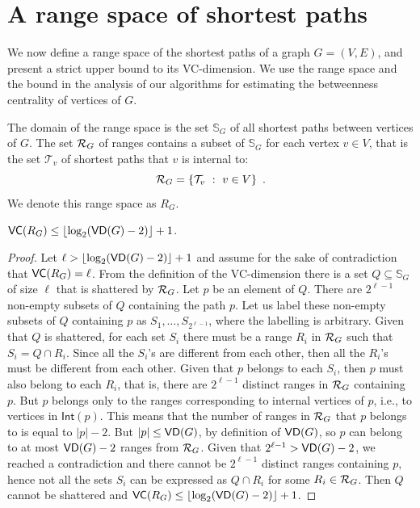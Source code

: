 \section{A range space of shortest paths}\label{sec:centrsamplrangeset}
We now define a range space of the shortest paths of a graph $G=(V,E)$, and present 
a strict upper bound to its VC-dimension. %
We use the range space and the bound in the analysis of our algorithms for estimating
the betweenness centrality of vertices of $G$.

The domain of the range space is the set $\mathbb{S}_G$ of all shortest
paths between vertices of $G$. The set $\mathcal{R}_G$ of ranges contains a subset of
$\mathbb{S}_G$ for each vertex $v\in V$, that is the set $\mathcal{T}_v$ of
shortest paths that $v$ is internal to:
\[
\mathcal{R}_G = \{\mathcal{T}_v ~:~ v\in V\}\enspace.
\]
We denote this range space as $R_G$.

\begin{lemma}\label{lem:vcdimuppbound}
  $\mathsf{VC}(R_G)\le\lfloor\log_2(\mathsf{VD}(G)-2)\rfloor+1$.
\end{lemma}

\begin{proof}
Let $\ell>\lfloor\log_2(\mathsf{VD}(G)-2)\rfloor+1$ and assume for the sake of contradiction
that $\mathsf{VC}(R_G)=\ell$. From the definition of the VC-dimension there is a set
$Q\subseteq\mathbb{S}_G$ of size $\ell$ that is shattered by $\mathcal{R}_G$. Let $p$ be
an element of $Q$. There are  $2^{\ell-1}$ non-empty subsets of
$Q$ containing the path $p$. Let us label these non-empty subsets of $Q$ containing $p$ as
$S_1,\dotsc,S_{2^{\ell-1}}$, where the labelling is arbitrary.
Given that $Q$ is shattered, for each set $S_i$ there must be a range $R_i$ in
$\mathcal{R}_G$ such that $S_i=Q\cap R_i$. Since all the $S_i$'s are
different from each other, then all the $R_i$'s must be different from each
other. Given that $p$ belongs to each $S_i$, then $p$ must also belong to each
$R_i$, that is, there are $2^{\ell-1}$ distinct ranges in $\mathcal{R}_G$ containing
$p$. But $p$ belongs only to the ranges corresponding to internal vertices of
$p$, i.e., to vertices in $\mathsf{Int}(p)$. This means that the number of ranges
in $\mathcal{R}_G$ that $p$ belongs to is equal to $|p|-2$. But $|p|\le\mathsf{VD}(G)$, by
definition of $\mathsf{VD}(G)$, so $p$
can belong to at most $\mathsf{VD}(G)-2$ ranges from $\mathcal{R}_G$. Given that
$2^{\ell-1}>\mathsf{VD}(G)-2$, we reached a contradiction and there cannot be $2^{\ell-1}$
distinct ranges containing $p$, hence not all the sets $S_i$ can be expressed as
$Q\cap R_i$ for some $R_i\in\mathcal{R}_G$. Then $Q$ cannot be shattered and
$\mathsf{VC}(R_G)\le\lfloor\log_2(\mathsf{VD}(G)-2)\rfloor+1$.%
\end{proof}

